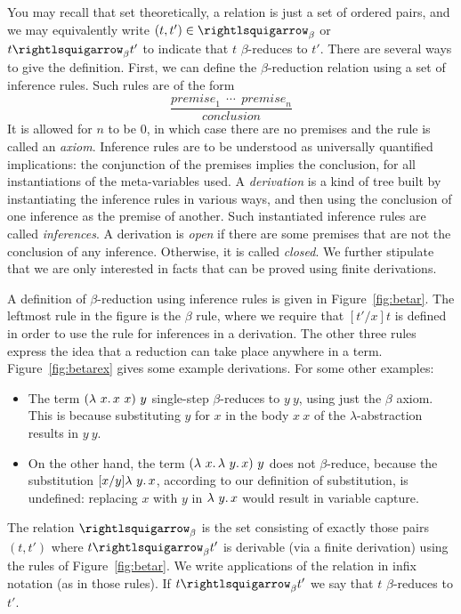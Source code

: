 You may recall that set theoretically, a relation is just a set of
ordered pairs, and we may equivalently write $(t,t')\in\betar$ or $t
\betar t'$ to indicate that $t$ $\beta$-reduces to $t'$.  There are
several ways to give the definition.
First, we can define the $\beta$-reduction relation using a set of inference rules.
Such rules are of the form
\[
\frac{\textit{premise}_1 \ \ \cdots \ \ \textit{premise}_n}{\textit{conclusion}}
\]
\noindent It is allowed for $n$ to be $0$, in which case there are no
premises and the rule is called an \emph{axiom}.  Inference rules are
to be understood as universally quantified implications: the
conjunction of the premises implies the conclusion, for all
instantiations of the meta-variables used.  A \emph{derivation} is a
kind of tree built by instantiating the inference rules in various
ways, and then using the conclusion of one inference as the premise of
another.  Such instantiated inference rules are
called \emph{inferences}.  A derivation is
\emph{open} if there are some premises that are not the conclusion of
any inference.  Otherwise, it is called
\emph{closed}. We further stipulate that we
are only interested in facts that can be proved using finite
derivations.  

A definition of $\beta$-reduction using inference rules is given in
Figure~\ref{fig:betar}.  The leftmost rule in the figure is the
$\beta$ rule, where we require that $[t'/x]t$ is defined
in order to use the rule for inferences in a derivation.  The other
three rules express the idea that a reduction can take place anywhere
in a term.  Figure~\ref{fig:betarex} gives some example derivations.
For some other examples:
\begin{itemize}
\item The term $(\lambda\ x.\, x\ x)\ y$ single-step $\beta$-reduces to $y\ y$,
  using just the $\beta$ axiom.  This is because substituting $y$ for $x$
  in the body $x\ x$ of the $\lambda$-abstraction results in $y\ y$.
\item On the other hand, the term $(\lambda\ x.\, \lambda\ y.\, x)\ y$ does not
  $\beta$-reduce, because the substitution $[x/y]\lambda\ y.\, x$, according
  to our definition of substitution, is undefined: replacing $x$ with $y$ in
  $\lambda\ y.\, x$ would result in variable capture.
  \end{itemize}
  
\begin{definition}
\label{def:beta}
The relation $\betar$ is the set consisting of exactly those
pairs $(t,t')$ where $t \betar t'$ is derivable (via a finite derivation) using the
rules of Figure~\ref{fig:betar}.  We write applications of the
relation in infix notation (as in those rules).  If $t \betar t'$
we say that $t$ $\beta$-reduces to $t'$.  \index{$\betar$}
\end{definition}

